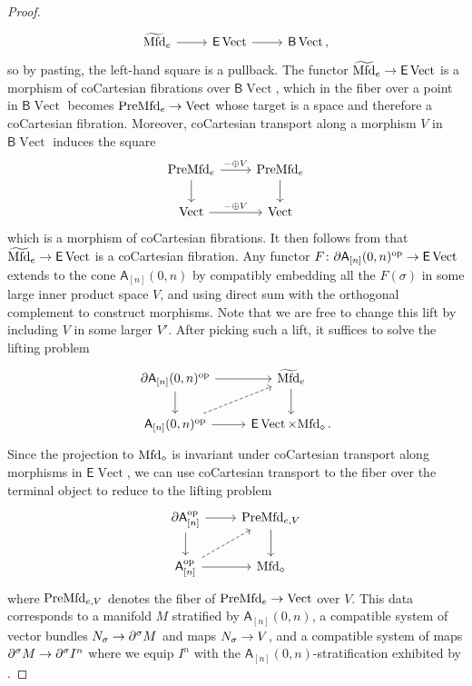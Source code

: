 \documentclass[10pt,a4paper]{amsart}
\newcommand{\Mfd}{\mathrm{Mfd}\vphantom{d}}
\newcommand{\PreMfd}{\mathrm{PreMfd}\vphantom{d}}
\DeclareMathOperator{\Vect}{Vect}
\newcommand{\del}{\partial}
\DeclareMathOperator{\op}{op}
\newcommand{\sfA}{\mathsf{A}}
\newcommand{\sfB}{\mathsf{B}}
\newcommand{\sfE}{\mathsf{E}}
\renewcommand{\to}{\mathchoice{\longrightarrow}{\rightarrow}{}{}}
\begin{document}
\begin{proof}
\begin{equation*}
\begin{tikzcd}
			\widetilde{\Mfd}_{e}  \arrow[r]               &   \sfE\Vect  \arrow[r]            &  \sfB \Vect \, ,
		\end{tikzcd}
	\end{equation*}
	so by pasting, the left-hand square is a pullback.
  The functor $\widetilde{\Mfd}_{e}\to \sfE \Vect$ is a morphism of coCartesian fibrations over $\sfB \Vect$, which in the fiber over a point in $\sfB\Vect$ becomes $\PreMfd_{e}\to \Vect$ whose target is a space and therefore a coCartesian fibration.
  Moreover, coCartesian transport along a morphism $V$ in $\sfB\Vect$ induces the square
	\begin{equation*}
		\begin{tikzcd}
			\PreMfd_{e} \arrow[r, "-\oplus V"] \arrow[d]      &   \PreMfd_{e}  \arrow[d] \\
			\Vect  \arrow[r, "-\oplus V"]               &   \Vect
		\end{tikzcd}
	\end{equation*}
	which is a morphism of coCartesian fibrations.
  It then follows from  that $\widetilde{\Mfd}_{e}\to \sfE\Vect$ is a coCartesian fibration.
  Any functor $F\colon \del \sfA_{[n]}(0,n)^{\op} \to \sfE \Vect$ extends to the cone $\sfA_{[n]}(0,n)$ by compatibly embedding all the $F(\sigma)$ in some large inner product space $V$, and using direct sum with the orthogonal complement to construct morphisms.
  Note that we are free to change this lift by including $V$ in some larger $V'$.
  After picking such a lift, it suffices to solve the lifting problem
	\begin{equation*}
		\begin{tikzcd}
			\del \sfA_{[n]}(0,n)^{\op} \arrow[r] \arrow[d]      &   \widetilde{\Mfd}_{e} \arrow[d] \\
			\sfA_{[n]}(0,n)^{\op}  \arrow[r]  \arrow[ur,dashed]              &   \sfE \Vect \times \Mfd_{\diamond} \,.
		\end{tikzcd}
	\end{equation*}
	Since the projection to $\Mfd_{\diamond}$ is invariant under coCartesian transport along morphisms in $\sfE \Vect$, we can use coCartesian transport to the fiber over the terminal object to reduce to the lifting problem
	\begin{equation*}
		\begin{tikzcd}
			\del \sfA_{[n]}^{\op} \arrow[r] \arrow[d]      &   \PreMfd_{e,V}  \arrow[d] \\
			\sfA_{[n]}^{\op}  \arrow[r] \arrow[ur,dashed]              &   \Mfd_{\diamond}
		\end{tikzcd}
	\end{equation*}
	where $\PreMfd_{e,V}$ denotes the fiber of $\PreMfd_{e}\to \Vect$ over $V$.
  This data corresponds to a manifold $M$ stratified by $\sfA_{[n]}(0,n)$, a compatible system of vector bundles $N_{\sigma} \to \del^{\sigma}M$ and maps $N_{\sigma} \to V$, and a compatible system of maps $\del^{\sigma}M\to \del^{\sigma}I^{n}$ where we equip $I^{n}$ with the $\sfA_{[n]}(0,n)$-stratification exhibited by .


\end{proof}
\end{document}
